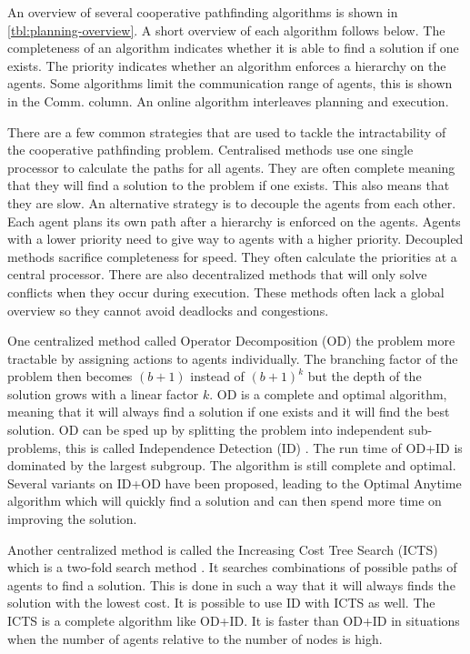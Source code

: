 An overview of several cooperative pathfinding algorithms is shown in 
\autoref{tbl:planning-overview}. A short overview of each algorithm follows 
below. The completeness of an algorithm indicates whether it is able to find a 
solution if one exists. The priority indicates whether an algorithm enforces a 
hierarchy on the agents. Some algorithms limit the communication range of 
agents, this is shown in the Comm. column. An online algorithm interleaves 
planning and execution.

There are a few common strategies that are used to tackle the intractability of 
the cooperative pathfinding problem. Centralised methods use one single 
processor to calculate the paths for all agents. They are often complete 
meaning that they 
will find a solution to the problem if one exists. This also means that they 
are slow. An alternative strategy is to decouple the agents from each other. 
Each agent plans its own path after a hierarchy is enforced on the agents. 
Agents with a lower priority need to give way to agents with a higher priority. 
Decoupled methods sacrifice completeness for speed. They often calculate the 
priorities at a central processor. There are also decentralized methods that 
will only solve conflicts when they occur during execution. These methods often 
lack a global overview so they cannot avoid deadlocks and congestions.

One centralized method called Operator Decomposition (OD) 
\citep{standley2010,standley2011} the problem more tractable by assigning 
actions to agents individually. The branching factor of the problem then 
becomes $(b+1)$ instead of $(b+1)^k$ but the depth of the solution grows with a 
linear factor $k$. OD is a complete and optimal algorithm, meaning that it 
will always find a solution if one exists and it will find the best solution. 
OD can be sped up by splitting the problem into independent sub-problems, this 
is called Independence Detection (ID) \citep{standley2010}. The run time of 
OD+ID is dominated by the largest subgroup. The algorithm is still complete and 
optimal. Several variants on ID+OD have been proposed, leading to the Optimal 
Anytime algorithm \citep{standley2011} which will quickly find a solution and 
can then spend more time on improving the solution.

Another centralized method is called the Increasing Cost Tree Search (ICTS)
which is a two-fold search method \citep{sharon2013}. It searches combinations 
of possible paths of agents to find a solution. This is done in such a way that 
it will always finds the solution with the lowest cost. It is possible to use 
ID with ICTS as well. The ICTS is a complete algorithm like OD+ID. It is faster 
than OD+ID in situations when the number of agents relative to the number of 
nodes is high.

